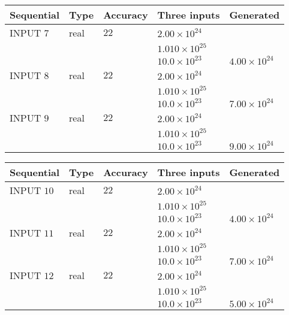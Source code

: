 \documentclass[12pt]{article}
\begin{document}
   
  
  
\noindent\begin{tabular}{|l|l|l|l|l|}
\hline
 Sequential & Type & Accuracy & Three inputs & Generated \\ 
\hline
 
 
  INPUT $           7$ & real & $          22 $ & $
 2.00 \times 10^{24}
  $ & \\
  & & &  $
 1.010 \times 10^{25}
  $ & \\
  & & &  $
 10.0 \times 10^{23}
 $ & $ 4.00 \times 10^{24} $ 
 \\  \hline  
 
 
  INPUT $           8$ & real & $          22 $ & $
 2.00 \times 10^{24}
  $ & \\
  & & &  $
 1.010 \times 10^{25}
  $ & \\
  & & &  $
 10.0 \times 10^{23}
 $ & $ 7.00 \times 10^{24} $ 
 \\  \hline  
 
 
  INPUT $           9$ & real & $          22 $ & $
 2.00 \times 10^{24}
  $ & \\
  & & &  $
 1.010 \times 10^{25}
  $ & \\
  & & &  $
 10.0 \times 10^{23}
 $ & $ 9.00 \times 10^{24} $ 
 \\  \hline  
 \end{tabular}
   
   
  
  
\noindent\begin{tabular}{|l|l|l|l|l|}
\hline
 Sequential & Type & Accuracy & Three inputs & Generated \\ 
\hline
 
 
  INPUT $          10$ & real & $          22 $ & $
 2.00 \times 10^{24}
  $ & \\
  & & &  $
 1.010 \times 10^{25}
  $ & \\
  & & &  $
 10.0 \times 10^{23}
 $ & $ 4.00 \times 10^{24} $ 
 \\  \hline  
 
 
  INPUT $          11$ & real & $          22 $ & $
 2.00 \times 10^{24}
  $ & \\
  & & &  $
 1.010 \times 10^{25}
  $ & \\
  & & &  $
 10.0 \times 10^{23}
 $ & $ 7.00 \times 10^{24} $ 
 \\  \hline  
 
 
  INPUT $          12$ & real & $          22 $ & $
 2.00 \times 10^{24}
  $ & \\
  & & &  $
 1.010 \times 10^{25}
  $ & \\
  & & &  $
 10.0 \times 10^{23}
 $ & $ 5.00 \times 10^{24} $ 
 \\  \hline  
 \end{tabular}
   
\end{document}

